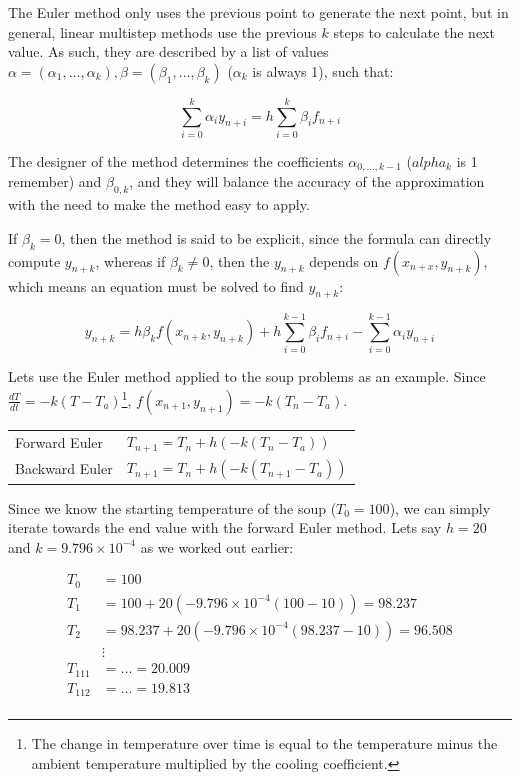 The Euler method only uses the previous point to generate the next
point, but in general, linear multistep methods use the previous $k$
steps to calculate the next value. As such, they are described by a
list of values $\alpha = (\alpha_1, \dots, \alpha_k), \beta =
(\beta_1,\dots,\beta_k)$ ($\alpha_k$ is always 1), such that:

\[
  \sum\limits^k_{i=0}\alpha_iy_{n+i} = h \sum\limits^k_{i=0}\beta_if_{n+i}
\]

The designer of the method determines the coefficients
$\alpha_{0,\dots,k-1}$ ($alpha_k$ is 1 remember) and $\beta_{0, k}$,
and they will balance the accuracy of the approximation with the need
to make the method easy to apply.

If $\beta_k = 0$, then the method is said to be explicit, since the
formula can directly compute $y_{n + k}$, whereas if $\beta_k \neq 0$,
then the $y_{n+k}$ depends on $f(x_{n+x},y_{n+k})$, which means an
equation must be solved to find $y_{n+k}$:

\[
  y_{n+k} = h\beta_kf(x_{n+k},y_{n+k})
              + h\sum\limits^{k-1}_{i=0}\beta_if_{n+i}
              - \sum\limits^{k-1}_{i=0}\alpha_iy_{n+i}
\]

Lets use the Euler method applied to the soup problems as an
example. Since $\frac{dT}{dt} = -k(T - T_a)$\footnote{The change in
temperature over time is equal to the temperature minus the ambient
temperature multiplied by the cooling coefficient.},
$f(x_{n+1},y_{n+1}) = -k(T_n - T_a)$.

\begin{center}
\begin{tabular}{ll}
  Forward Euler & $T_{n+1} = T_n + h(-k(T_n - T_a))$\\
  Backward Euler & $T_{n+1} = T_n + h(-k(T_{n+1} - T_a))$\\
\end{tabular}
\end{center}

Since we know the starting temperature of the soup ($T_0 = 100$), we
can simply iterate towards the end value with the forward Euler
method. Lets say $h = 20$ and $k = 9.796\times10^{-4}$ as we worked
out earlier:

\[
\begin{split}
  T_0 &= 100\\
  T_1 &= 100 + 20(-9.796\times10^{-4}(100 - 10)) = 98.237\\
  T_2 &= 98.237 + 20(-9.796\times10^{-4}(98.237 - 10)) = 96.508\\
  &\vdots\\
  T_{111} &= \dots = 20.009\\
  T_{112} &= \dots = 19.813\\
\end{split}
\]

